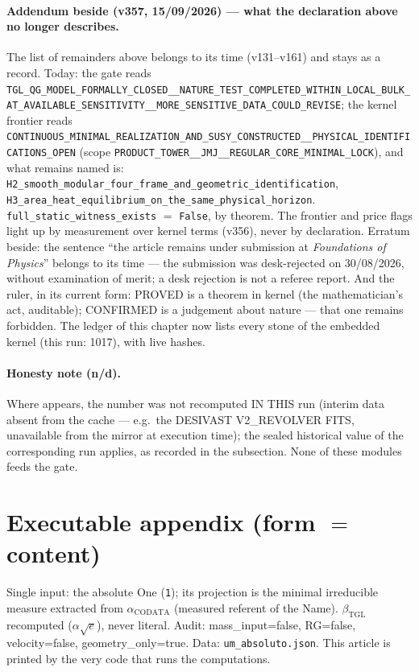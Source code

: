 \documentclass[11pt]{article}
\newcommand{\bTGL}{\beta_{\mathrm{TGL}}}\newcommand{\Msun}{M_{\odot}}\newcommand{\TGL}{\mathrm{TGL}}
\theoremstyle{definition}\newtheorem{deriv}{Derivation}
\begin{document}
\paragraph*{Addendum beside (v357, 15/09/2026) --- what the declaration above no longer describes.} The list of remainders above belongs to its time (v131--v161) and stays as a record. Today: the gate reads \texttt{TGL\_QG\_MODEL\_FORMALLY\_CLOSED\_\_NATURE\_TEST\_COMPLETED\_WITHIN\_LOCAL\_BULK\_AT\_AVAILABLE\_SENSITIVITY\_\_MORE\_SENSITIVE\_DATA\_COULD\_REVISE}; the kernel frontier reads \texttt{CONTINUOUS\_MINIMAL\_REALIZATION\_AND\_SUSY\_CONSTRUCTED\_\_PHYSICAL\_IDENTIFICATIONS\_OPEN} (scope \texttt{PRODUCT\_TOWER\_\_JMJ\_\_REGULAR\_CORE\_MINIMAL\_LOCK}), and what remains named is: \texttt{H2\_smooth\_modular\_four\_frame\_and\_geometric\_identification}, \texttt{H3\_area\_heat\_equilibrium\_on\_the\_same\_physical\_horizon}. \texttt{full\_static\_witness\_exists} $=$ \texttt{False}, by theorem. The frontier and price flags light up by measurement over kernel terms (v356), never by declaration. Erratum beside: the sentence ``the article remains under submission at \emph{Foundations of Physics}'' belongs to its time --- the submission was desk-rejected on 30/08/2026, without examination of merit; a desk rejection is not a referee report. And the ruler, in its current form: PROVED is a theorem in kernel (the mathematician's act, auditable); CONFIRMED is a judgement about nature --- that one remains forbidden. The ledger of this chapter now lists every stone of the embedded kernel (this run: 1017), with live hashes.

\paragraph{Honesty note (n/d).} Where  appears, the number was not recomputed IN THIS run (interim data absent from the cache --- e.g.\ the DESIVAST V2\_REVOLVER FITS, unavailable from the mirror at execution time); the sealed historical value of the corresponding run applies, as recorded in the subsection. None of these modules feeds the gate.

\section*{Executable appendix (form $=$ content)}

Single input: the absolute One (\texttt{1}); its projection is the minimal irreducible measure extracted from $\alpha_{\mathrm{CODATA}}$ (measured referent of the Name). $\bTGL$ recomputed ($\alpha\sqrt{e}$), never literal. Audit: mass\_input=false, RG=false, velocity=false, geometry\_only=true. Data: \texttt{um\_absoluto.json}. This article is printed by the very code that runs the computations.
\end{document}
